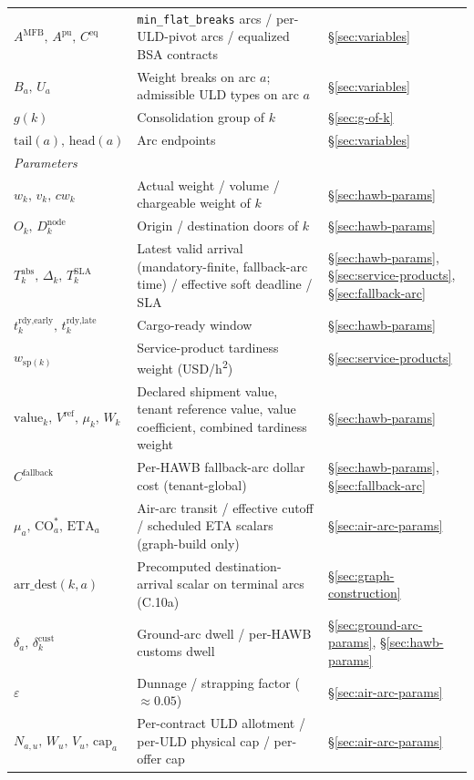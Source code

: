 \documentclass[11pt,a4paper]{article}
\theoremstyle{definition}
\begin{document}
\begin{table}[H]
\begin{tabular}{lp{9cm}p{3.5cm}}
$A^{\text{MFB}},\, A^{\text{pu}},\, C^{\text{eq}}$ & \texttt{min\_flat\_breaks} arcs / per-ULD-pivot arcs / equalized BSA contracts & \S\ref{sec:variables} \\
$B_a,\, U_a$ & Weight breaks on arc $a$; admissible ULD types on arc $a$ & \S\ref{sec:variables} \\
$g(k)$ & Consolidation group of $k$ & \S\ref{sec:g-of-k} \\
$\text{tail}(a),\, \text{head}(a)$ & Arc endpoints & \S\ref{sec:variables} \\
\midrule
\multicolumn{3}{l}{\textit{Parameters}} \\
$w_k,\, v_k,\, cw_k$ & Actual weight / volume / chargeable weight of $k$ & \S\ref{sec:hawb-params} \\
$O_k,\, D_k^{\text{node}}$ & Origin / destination doors of $k$ & \S\ref{sec:hawb-params} \\
$T_k^{\text{abs}},\, \Delta_k,\, T_k^{\text{SLA}}$ & Latest valid arrival (mandatory-finite, fallback-arc time) / effective soft deadline / SLA & \S\ref{sec:hawb-params}, \S\ref{sec:service-products}, \S\ref{sec:fallback-arc} \\
$t_k^{\text{rdy,early}},\, t_k^{\text{rdy,late}}$ & Cargo-ready window & \S\ref{sec:hawb-params} \\
$w_{\text{sp}(k)}$ & Service-product tardiness weight (USD/h\textsuperscript{2}) & \S\ref{sec:service-products} \\
$\text{value}_k,\, V^{\text{ref}},\, \mu_k,\, W_k$ & Declared shipment value, tenant reference value, value coefficient, combined tardiness weight & \S\ref{sec:hawb-params} \\
$C^{\text{fallback}}$ & Per-HAWB fallback-arc dollar cost (tenant-global) & \S\ref{sec:hawb-params}, \S\ref{sec:fallback-arc} \\
$\mu_a,\, \text{CO}_a^*,\, \text{ETA}_a$ & Air-arc transit / effective cutoff / scheduled ETA scalars (graph-build only) & \S\ref{sec:air-arc-params} \\
$\text{arr\_dest}(k, a)$ & Precomputed destination-arrival scalar on terminal arcs (C.10a) & \S\ref{sec:graph-construction} \\
$\delta_a,\, \delta^{\text{cust}}_k$ & Ground-arc dwell / per-HAWB customs dwell & \S\ref{sec:ground-arc-params}, \S\ref{sec:hawb-params} \\
$\varepsilon$ & Dunnage / strapping factor ($\approx 0.05$) & \S\ref{sec:air-arc-params} \\
$N_{a,u},\, W_u,\, V_u,\, \text{cap}_a$ & Per-contract ULD allotment / per-ULD physical cap / per-offer cap & \S\ref{sec:air-arc-params} \\

\end{tabular}
\end{table}
\end{document}
